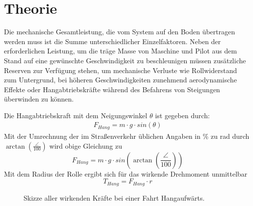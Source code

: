 \chapter{Theorie}
	Die mechanische Gesamtleistung, die vom System auf den Boden übertragen werden muss ist die Summe unterschiedlicher Einzelfaktoren.
	Neben der erforderlichen Leistung, um die träge Masse von Maschine und Pilot aus dem Stand auf eine gewünschte Geschwindigkeit zu beschleunigen müssen zusätzliche Reserven zur Verfügung stehen, um mechanische Verluste wie Rollwiderstand zum Untergrund, bei höheren Geschwindigkeiten zunehmend aerodynamische Effekte oder Hangabtriebskräfte während des Befahrens von Steigungen überwinden zu können.\par\medskip
	Die Hangabtriebskraft mit dem Neigungswinkel \(\theta\) ist gegeben durch:
	\begin{align}
		F_{Hang} = m \cdot g \cdot sin\left(\theta\right)
		\label{eq:downhill force}
	\end{align}
	Mit der Umrechnung der im Straßenverkehr üblichen Angaben in \unit{\percent} zu \unit{\radian} durch \(\arctan\left(\frac{\angle}{100}\right)\) wird obige Gleichung zu
	\begin{equation}
		F_{Hang} = m \cdot g \cdot sin\left(\arctan\left(\frac{\angle}{100}\right)\right)
		\label{eq:downhill force incline to radian}
	\end{equation}
	Mit dem Radius der Rolle ergibt sich für das wirkende Drehmoment unmittelbar
	\begin{equation}
		T_{Hang} = F_{Hang} \cdot r
		\label{eq:incline torque}
	\end{equation}
	\begin{figure}[h]
		\centering
		
		\caption[Skizze aller wirkenden Kräfte bei einer Fahrt Hangaufwärts]{Skizze aller wirkenden Kräfte bei einer Fahrt Hangaufwärts.}
		\label{fig:sketch torque incline}
	\end{figure}
	
